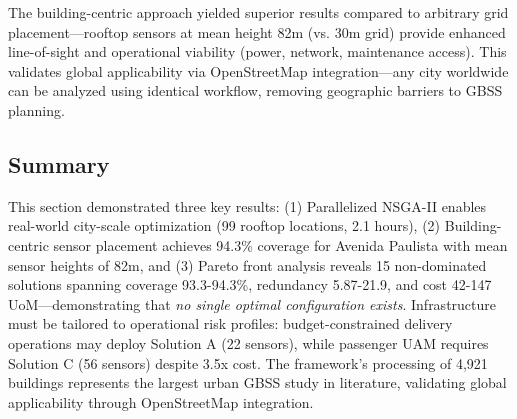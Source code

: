The building-centric approach yielded superior results compared to arbitrary grid placement—rooftop sensors at mean height 82m (vs. 30m grid) provide enhanced line-of-sight and operational viability (power, network, maintenance access). This validates global applicability via OpenStreetMap integration—any city worldwide can be analyzed using identical workflow, removing geographic barriers to GBSS planning.

\subsection{Summary}

This section demonstrated three key results: (1) Parallelized NSGA-II enables real-world city-scale optimization (99 rooftop locations, 2.1 hours), (2) Building-centric sensor placement achieves 94.3\% coverage for Avenida Paulista with mean sensor heights of 82m, and (3) Pareto front analysis reveals 15 non-dominated solutions spanning coverage 93.3-94.3\%, redundancy 5.87-21.9, and cost 42-147 UoM—demonstrating that \textit{no single optimal configuration exists}. Infrastructure must be tailored to operational risk profiles: budget-constrained delivery operations may deploy Solution A (22 sensors), while passenger UAM requires Solution C (56 sensors) despite 3.5x cost. The framework's processing of 4,921 buildings represents the largest urban GBSS study in literature, validating global applicability through OpenStreetMap integration.

